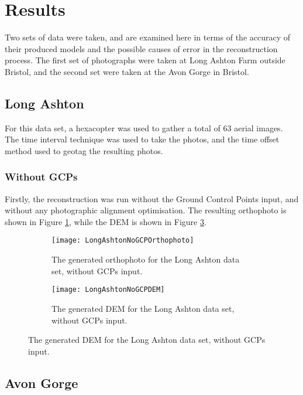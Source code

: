 \section{Results}

Two sets of data were taken, and are examined here in terms of the accuracy of
their produced models and the possible causes of error in the reconstruction
process. The first set of photographs were taken at Long Ashton Farm outside
Bristol, and the second set were taken at the Avon Gorge in Bristol.

\subsection{Long Ashton}

For this data set, a hexacopter was used to gather a total of 63 aerial images.
The time interval technique was used to take the photos, and the time offset
method used to geotag the resulting photos.

\subsubsection{Without GCPs}

Firstly, the reconstruction was run without the Ground Control Points input, and
without any photographic alignment optimisation. The resulting orthophoto is
shown in Figure \ref{img:long-ashton/no-gcp/orthophoto}, while the DEM is shown
in Figure \ref{img:long-ashton/no-gcp/dem}.

\begin{figure}
    \centering
    \begin{subfigure}[b]{0.49\textwidth}
        \texttt{[image: LongAshtonNoGCPOrthophoto]}
        \caption{The generated orthophoto for the Long Ashton data set, without
        GCPs input.}
        \label{img:long-ashton/no-gcp/orthophoto}
    \end{subfigure}
    \begin{subfigure}[b]{0.49\textwidth}
        \texttt{[image: LongAshtonNoGCPDEM]}
        \caption{The generated DEM for the Long Ashton data set, without GCPs
        input.}
        \label{img:long-ashton/no-gcp/dem}
    \end{subfigure}
\end{figure}

\subsection{Avon Gorge}

